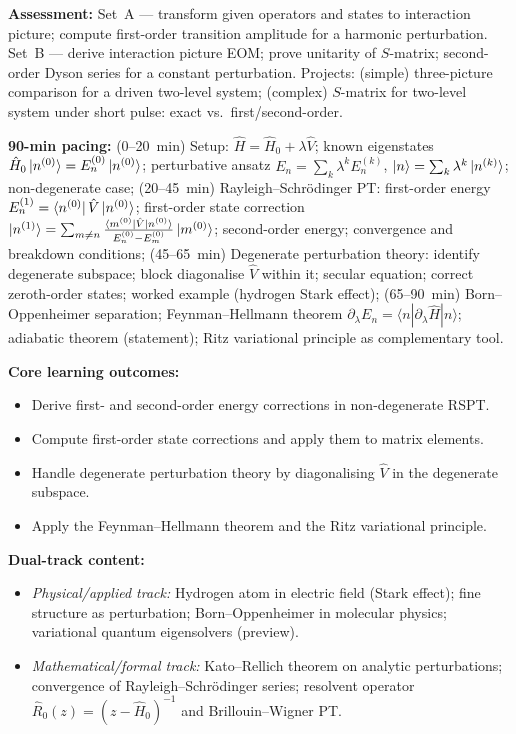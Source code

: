 \documentclass[11pt,a4paper]{article}
\begin{document}
\begin{tcolorbox}[modulebox, title={Module~I.3 / L08: The Dirac (Interaction) Picture}]
\medskip\textbf{Assessment:}
Set~A --- transform given operators and states to interaction picture;
compute first-order transition amplitude for a harmonic perturbation.
Set~B --- derive interaction picture EOM; prove unitarity of $S$-matrix;
second-order Dyson series for a constant perturbation.
Projects: (simple) three-picture comparison for a driven two-level system;
(complex) $S$-matrix for two-level system under short pulse: exact vs.\ first/second-order.
\end{tcolorbox}

\medskip
\begin{tcolorbox}[modulebox, title={Module~I.3 / L09: Perturbation Theory}]
\textbf{90-min pacing:} (0--20~min) Setup: $\hat{H}=\hat{H}_0+\lambda\hat{V}$;
known eigenstates $\hat{H}_0\ket{n^{(0)}}=E_n^{(0)}\ket{n^{(0)}}$;
perturbative ansatz $E_n=\sum_k\lambda^k E_n^{(k)}$,
$\ket{n}=\sum_k\lambda^k\ket{n^{(k)}}$; non-degenerate case;
(20--45~min) Rayleigh--Schr\"odinger PT: first-order energy $E_n^{(1)}=\bra{n^{(0)}}\hat{V}\ket{n^{(0)}}$;
first-order state correction $\ket{n^{(1)}}=\sum_{m\neq n}\tfrac{\bra{m^{(0)}}\hat{V}\ket{n^{(0)}}}{E_n^{(0)}-E_m^{(0)}}\ket{m^{(0)}}$;
second-order energy; convergence and breakdown conditions;
(45--65~min) Degenerate perturbation theory: identify degenerate subspace;
block diagonalise $\hat{V}$ within it; secular equation; correct zeroth-order states;
worked example (hydrogen Stark effect);
(65--90~min) Born--Oppenheimer separation;
Feynman--Hellmann theorem $\partial_\lambda E_n=\langle n|\partial_\lambda\hat{H}|n\rangle$;
adiabatic theorem (statement); Ritz variational principle as complementary tool.

\medskip\textbf{Core learning outcomes:}
\begin{itemize}[leftmargin=1.4em,topsep=2pt,itemsep=1pt]
  \item Derive first- and second-order energy corrections in non-degenerate RSPT.
  \item Compute first-order state corrections and apply them to matrix elements.
  \item Handle degenerate perturbation theory by diagonalising $\hat{V}$ in the degenerate subspace.
  \item Apply the Feynman--Hellmann theorem and the Ritz variational principle.
\end{itemize}

\medskip\textbf{Dual-track content:}
\begin{itemize}[leftmargin=1.4em,topsep=2pt,itemsep=1pt]
  \item \textit{Physical/applied track:} Hydrogen atom in electric field (Stark effect);
    fine structure as perturbation; Born--Oppenheimer in molecular physics;
    variational quantum eigensolvers (preview).
  \item \textit{Mathematical/formal track:} Kato--Rellich theorem on analytic perturbations;
    convergence of Rayleigh--Schr\"odinger series; resolvent operator
    $\hat{R}_0(z)=(z-\hat{H}_0)^{-1}$ and Brillouin--Wigner PT.
\end{itemize}


\end{tcolorbox}
\end{document}
